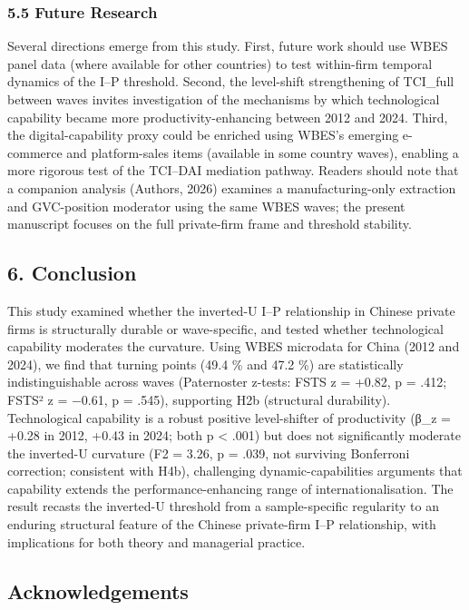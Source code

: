 \documentclass[
  12pt,a4paper]{article}
\begin{document}
\hypertarget{future-research}{%
\subsubsection{5.5 Future Research}\label{future-research}}

Several directions emerge from this study. First, future work should use
WBES panel data (where available for other countries) to test
within-firm temporal dynamics of the I--P threshold. Second, the
level-shift strengthening of TCI\_full between waves invites
investigation of the mechanisms by which technological capability became
more productivity-enhancing between 2012 and 2024. Third, the
digital-capability proxy could be enriched using WBES's emerging
e-commerce and platform-sales items (available in some country waves),
enabling a more rigorous test of the TCI--DAI mediation pathway. Readers
should note that a companion analysis (Authors, 2026) examines a
manufacturing-only extraction and GVC-position moderator using the same
WBES waves; the present manuscript focuses on the full private-firm
frame and threshold stability.

\hypertarget{conclusion}{%
\subsection{6. Conclusion}\label{conclusion}}

This study examined whether the inverted-U I--P relationship in Chinese
private firms is structurally durable or wave-specific, and tested
whether technological capability moderates the curvature. Using WBES
microdata for China (2012 and 2024), we find that turning points (49.4
\% and 47.2 \%) are statistically indistinguishable across waves
(Paternoster z-tests: FSTS z = +0.82, p = .412; FSTS² z = −0.61, p =
.545), supporting H2b (structural durability). Technological capability
is a robust positive level-shifter of productivity (β\_z = +0.28 in
2012, +0.43 in 2024; both p \textless{} .001) but does not significantly
moderate the inverted-U curvature (F2 = 3.26, p = .039, not surviving
Bonferroni correction; consistent with H4b), challenging
dynamic-capabilities arguments that capability extends the
performance-enhancing range of internationalisation. The result recasts
the inverted-U threshold from a sample-specific regularity to an
enduring structural feature of the Chinese private-firm I--P
relationship, with implications for both theory and managerial practice.

\hypertarget{acknowledgements}{%
\subsection{Acknowledgements}\label{acknowledgements}}
\end{document}
